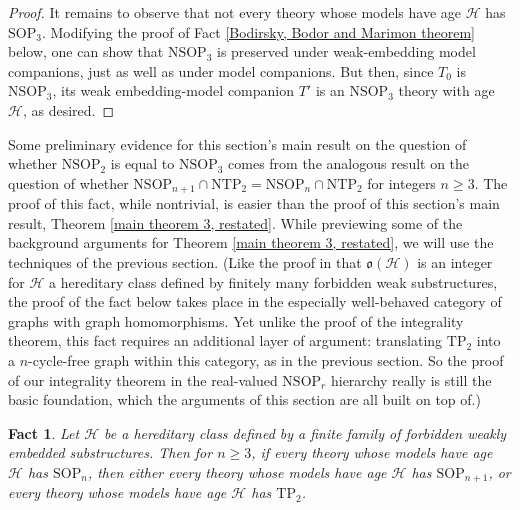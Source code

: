 \documentclass{amsart}
\newtheorem{fact}[theorem]{Fact}
\theoremstyle{definition}
\theoremstyle{remark}
\numberwithin{equation}{section}
\begin{document}
\begin{proof}
It remains to observe that not every theory whose models have age $\mathcal{H}$ has $\mathrm{SOP}_{3}$. Modifying the proof of Fact \ref{Bodirsky, Bodor and Marimon theorem} below, one can show that $\mathrm{NSOP}_{3}$ is preserved under weak-embedding model companions, just as well as under model companions. But then, since $T_{0}$ is $\mathrm{NSOP}_{3}$, its weak embedding-model companion $T'$ is an $\mathrm{NSOP}_{3}$ theory with age $\mathcal{H}$, as desired.
    
\end{proof}



Some preliminary evidence for this section's main result on the question of whether $\mathrm{NSOP}_{2}$ is equal to $\mathrm{NSOP}_{3}$ comes from the analogous result on the question of whether $\mathrm{NSOP}_{n+1}\cap \mathrm{NTP}_{2} = \mathrm{NSOP}_{n} \cap \mathrm{NTP}_{2}$ for integers $n \geq 3$. The proof of this fact, while nontrivial, is easier than the proof of this section's main result, Theorem \ref{main theorem 3, restated}. While previewing some of the background arguments for Theorem \ref{main theorem 3, restated},  we will use the techniques of the previous section. (Like the proof in \cite{ApproxOrder} that $\mathfrak{o}(\mathcal{H})$ is an integer for $\mathcal{H}$ a hereditary class defined by finitely many forbidden weak substructures, the proof of the fact below takes place in the especially well-behaved category of graphs with graph homomorphisms. Yet unlike the proof of the integrality theorem, this fact requires an additional layer of argument: translating $\mathrm{TP}_{2}$ into a $n$-cycle-free graph within this category, as in the previous section. So the proof of our integrality theorem in the real-valued $\mathrm{NSOP}_{r}$ hierarchy really is still the basic foundation, which the arguments of this section are all built on top of.)

\begin{fact}\label{sop_n vs tp_2 in hereditary classes defined by finitely many forbidden weakly embedded substructures}
    Let $\mathcal{H}$ be a hereditary class defined by a finite family of forbidden weakly embedded substructures. Then for $n \geq 3$, if every theory whose models have age $\mathcal{H}$ has $\mathrm{SOP}_{n}$, then either every theory whose models have age $\mathcal{H}$ has $\mathrm{SOP}_{n+1}$, or every theory whose models have age $\mathcal{H}$ has $\mathrm{TP}_{2}$.
\end{fact}
\end{document}
